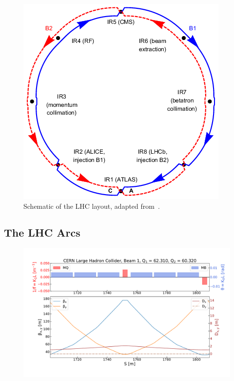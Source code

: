 \begin{figure}[!htb]
  \centering
  \includegraphics*[width=0.8\linewidth]{Figures/Optics_Measurements_Corrections_at_LHC/temp_lhc_schematic_layout.png}
  \caption{Schematic of the LHC layout, adapted from~\cite{JOI:Aaboud:Comparison_Simulated_Observed_Beam_Background_ATLAS}. }
  \label{figure:lhc_layout}
\end{figure}

\subsection{The LHC Arcs}
\label{subsection:lhc_arcs}

\begin{figure}[!hbt]
  \centering
  \includegraphics*[width=0.9\linewidth]{Figures/Optics_Measurements_Corrections_at_LHC/lhc_fodo_cell.pdf}
  \caption{}
  \label{figure:lhc_fodo_cell}
\end{figure}

